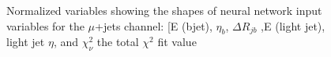 \begin{figure}[h!]
\vspace{-4.5mm}
\hfil
{}
\caption{Normalized variables showing the shapes of neural network input variables for the $\mu$+jets channel: [E (bjet), $\eta_b$, $\Delta R_{jb}$ ,E (light jet), light jet $\eta$, and $\chi^2_\nu$ the total $\chi^2$ fit value  }
\label{fig:VarPlots4}
\end{figure}



